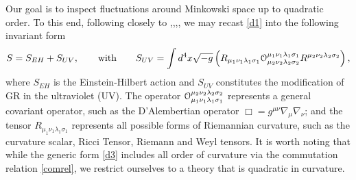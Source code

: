 Our goal is to inspect fluctuations around Minkowski space up to quadratic order. To this end, following closely to \cite{Biswas:2016egy},\cite{Biswas:2016etb},\cite{Biswas:2011ar},\cite{Biswas:2005qr}, we may recast \eqref{d1} into the following invariant form
\[
S=S_{EH}+S_{UV},\qquad\mbox{with}\qquad S_{UV}= \int d^4x\sqrt{-g}\left( R_{\mu_1 \nu_1 \lambda_1 \sigma_1}{\cal O}^{\mu_1 \nu_1 \lambda_1 \sigma_1}_{\mu_2 \nu_2 \lambda_2 \sigma_2}R^{\mu_2 \nu_2 \lambda_2 \sigma_2}\right)
\label{d3}
,\]
where $S_{EH}$ is the Einstein-Hilbert action and $S_{UV}$ constitutes the modification of GR in the ultraviolet (UV). The operator ${\cal O}_{\mu_{1}\nu_{1}\lambda_{1}\sigma_{1}}^{\mu_{2}\nu_{2}\lambda_{2}\sigma_{2}}$ represents a general covariant operator, such as the D'Alembertian operator $\Box=g^{\mu\nu}\nabla_{\mu}\nabla_{\nu}$; and the tensor $R_{\mu_{1}\nu_{1}\lambda_{1}\sigma_{1}}$ represents all possible forms of Riemannian curvature, such as the curvature scalar, Ricci Tensor, Riemann and Weyl tensors. It is worth noting that while the generic form \eqref{d3} includes all order of curvature via the commutation relation \eqref{comrel}, we restrict ourselves to a theory that is quadratic in curvature.


